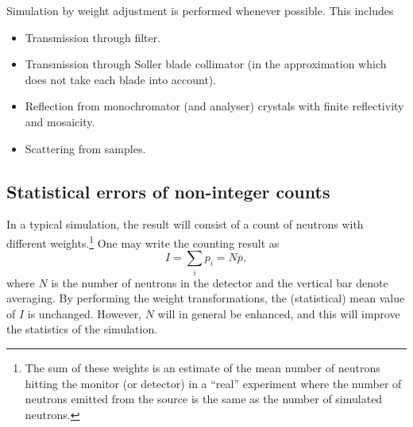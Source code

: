 Simulation by weight adjustment is performed
whenever possible. This includes
\begin{itemize}
\item Transmission through filter.
\item Transmission through Soller blade collimator
 (in the approximation
 which does not take each blade into account).
\item Reflection from monochromator (and analyser) crystals
 with finite reflectivity and mosaicity.
\item Scattering from samples.
\end{itemize}

\subsection{Statistical errors of non-integer counts}
\label{s:staterror}

In a typical simulation, the result will consist of a
count of neutrons with different weights.\footnote{The
sum of these weights is an estimate of 
the mean number of neutrons hitting the monitor 
(or detector) in a ``real'' experiment
where the number of neutrons emitted from the source
is the same as the number of simulated neutrons.}
One may write the counting result as
\begin{equation}
\label{psum}
I = \sum_i p_i = N \overline{p} ,
\end{equation}
where $N$ is the number of neutrons in the detector and the vertical bar denote
averaging.
By performing the weight transformations, the (statistical) 
mean value of $I$ is unchanged.
However, $N$ will in general be enhanced, 
and this will improve the statistics of the simulation.

